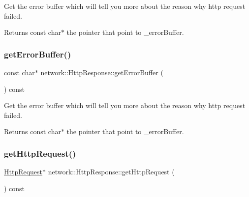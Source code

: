 Get the error buffer which will tell you more about the reason why http request failed. \begin{DoxyReturn}{Returns}
const char$\ast$ the pointer that point to \+\_\+error\+Buffer. 
\end{DoxyReturn}
\mbox{\label{classnetwork_1_1HttpResponse_a93f2be80baf4a6f82e7e7e0bf3399b43}} 
\subsubsection{\texorpdfstring{get\+Error\+Buffer()}{getErrorBuffer()}\hspace{0.1cm}{\footnotesize\ttfamily [2/2]}}
{\footnotesize\ttfamily const char$\ast$ network\+::\+Http\+Response\+::get\+Error\+Buffer (\begin{DoxyParamCaption}{ }\end{DoxyParamCaption}) const\hspace{0.3cm}{\ttfamily [inline]}}

Get the error buffer which will tell you more about the reason why http request failed. \begin{DoxyReturn}{Returns}
const char$\ast$ the pointer that point to \+\_\+error\+Buffer. 
\end{DoxyReturn}
\mbox{\label{classnetwork_1_1HttpResponse_a9f5228a87f350055ae7316d6dc26e26f}} 
\subsubsection{\texorpdfstring{get\+Http\+Request()}{getHttpRequest()}\hspace{0.1cm}{\footnotesize\ttfamily [1/2]}}
{\footnotesize\ttfamily \hyperlink{classnetwork_1_1HttpRequest}{Http\+Request}$\ast$ network\+::\+Http\+Response\+::get\+Http\+Request (\begin{DoxyParamCaption}{ }\end{DoxyParamCaption}) const\hspace{0.3cm}{\ttfamily [inline]}}

